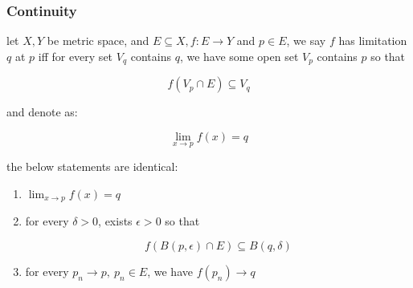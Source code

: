 \subsubsection{Continuity}

\begin{definition}[Limitation]
    let $X,Y$ be metric space, and $E \subseteq X, f: E \to Y$ and $p \in E$, we say
    $f$ has limitation $q$ at $p$ iff for every set $V_q$ contains $q$, we have some open set $V_p$ contains $p$ so that

    \[
        f(V_p \cap E) \subseteq V_q
    \]

    and denote as:

    \[
        \lim_{x \to p}f(x) = q
    \]
\end{definition}


\begin{exercise}
    the below statements are identical:

    \begin{enumerate}
        \item $\lim_{x \to p}f(x) = q$

        \item for every $\delta > 0$, exists $\epsilon > 0$ so that

        \[
            f(B(p, \epsilon) \cap E) \subseteq B(q, \delta)
        \]

        \item for every $p_n \to p,\: p_n \in E$, we have $f(p_n) \to q$
    \end{enumerate}
\end{exercise}

